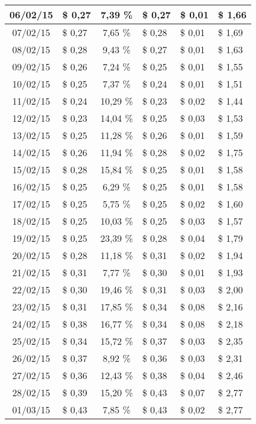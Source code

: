 \begin{center}
\begin{small}
\begin{longtable}{|c|l|c|l|l|l|}
06/02/15 & \$ 0,27 & 7,39 \% & \$ 0,27 & \$ 0,01 & \$ 1,66 \\ \hline
07/02/15 & \$ 0,27 & 7,65 \% & \$ 0,28 & \$ 0,01 & \$ 1,69 \\ \hline
08/02/15 & \$ 0,28 & 9,43 \% & \$ 0,27 & \$ 0,01 & \$ 1,63 \\ \hline
09/02/15 & \$ 0,26 & 7,24 \% & \$ 0,25 & \$ 0,01 & \$ 1,55 \\ \hline
10/02/15 & \$ 0,25 & 7,37 \% & \$ 0,24 & \$ 0,01 & \$ 1,51 \\ \hline
11/02/15 & \$ 0,24 & 10,29 \% & \$ 0,23 & \$ 0,02 & \$ 1,44 \\ \hline
12/02/15 & \$ 0,23 & 14,04 \% & \$ 0,25 & \$ 0,03 & \$ 1,53 \\ \hline
13/02/15 & \$ 0,25 & 11,28 \% & \$ 0,26 & \$ 0,01 & \$ 1,59 \\ \hline
14/02/15 & \$ 0,26 & 11,94 \% & \$ 0,28 & \$ 0,02 & \$ 1,75 \\ \hline
15/02/15 & \$ 0,28 & 15,84 \% & \$ 0,25 & \$ 0,01 & \$ 1,58 \\ \hline
16/02/15 & \$ 0,25 & 6,29 \% & \$ 0,25 & \$ 0,01 & \$ 1,58 \\ \hline
17/02/15 & \$ 0,25 & 5,75 \% & \$ 0,25 & \$ 0,02 & \$ 1,60 \\ \hline
18/02/15 & \$ 0,25 & 10,03 \% & \$ 0,25 & \$ 0,03 & \$ 1,57 \\ \hline
19/02/15 & \$ 0,25 & 23,39 \% & \$ 0,28 & \$ 0,04 & \$ 1,79 \\ \hline
20/02/15 & \$ 0,28 & 11,18 \% & \$ 0,31 & \$ 0,02 & \$ 1,94 \\ \hline
21/02/15 & \$ 0,31 & 7,77 \% & \$ 0,30 & \$ 0,01 & \$ 1,93 \\ \hline
22/02/15 & \$ 0,30 & 19,46 \% & \$ 0,31 & \$ 0,03 & \$ 2,00 \\ \hline
23/02/15 & \$ 0,31 & 17,85 \% & \$ 0,34 & \$ 0,08 & \$ 2,16 \\ \hline
24/02/15 & \$ 0,38 & 16,77 \% & \$ 0,34 & \$ 0,08 & \$ 2,18 \\ \hline
25/02/15 & \$ 0,34 & 15,72 \% & \$ 0,37 & \$ 0,03 & \$ 2,35 \\ \hline
26/02/15 & \$ 0,37 & 8,92 \% & \$ 0,36 & \$ 0,03 & \$ 2,31 \\ \hline
27/02/15 & \$ 0,36 & 12,43 \% & \$ 0,38 & \$ 0,04 & \$ 2,46 \\ \hline
28/02/15 & \$ 0,39 & 15,20 \% & \$ 0,43 & \$ 0,07 & \$ 2,77 \\ \hline
01/03/15 & \$ 0,43 & 7,85 \% & \$ 0,43 & \$ 0,02 & \$ 2,77 \\ \hline

\end{longtable}
\end{small}
\end{center}
